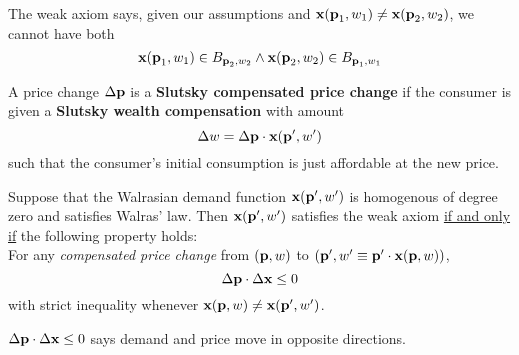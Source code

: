 \documentclass{article}
\begin{document}
 			\begin{corollary}
 				The weak axiom says, given our assumptions and $\textbf{x}(\textbf{p}_1, w_1) \neq \textbf{x}(\textbf{p}_2, w_2)$, we cannot have both 
 				\begin{equation}
 					\textbf{x}(\textbf{p}_1, w_1) \in B_{\textbf{p}_2, w_2} \land \textbf{x}(\textbf{p}_2, w_2) \in B_{\textbf{p}_1, w_1}
 				\end{equation}
 			\end{corollary}
 			
 			\begin{definition}
 				A price change $\Delta \textbf{p}$ is a \textbf{Slutsky compensated price change} if the consumer is given a \textbf{Slutsky wealth compensation} with amount
 				\begin{equation}
 					\Delta w = \Delta \textbf{p} \cdot \textbf{x}(\textbf{p}', w')
 				\end{equation}
 				such that the consumer's initial consumption is just affordable at the new price.
 			\end{definition}
 			
 			\begin{proposition}[2.F.1]
 				Suppose that the Walrasian demand function $\textbf{x}(\textbf{p}', w')$ is homogenous of degree zero and satisfies Walras' law. Then $\textbf{x}(\textbf{p}', w')$ satisfies the weak axiom \ul{if and only if} the following property holds: \\
 				For any \emph{compensated price change} from $(\textbf{p}, w)$ to $(\textbf{p}', w'\equiv \textbf{p}' \cdot \textbf{x}(\textbf{p}, w))$,
 				\begin{equation}
 					\Delta \textbf{p} \cdot \Delta \textbf{x} \leq 0
 				\end{equation}
 				with strict inequality whenever $\textbf{x}(\textbf{p}, w) \neq \textbf{x}(\textbf{p}', w')$.
 			\end{proposition}
 			
 			\begin{corollary}
 				$\Delta \textbf{p} \cdot \Delta \textbf{x} \leq 0$ says demand and price move in opposite directions.
 			\end{corollary}
 			
\end{document}

